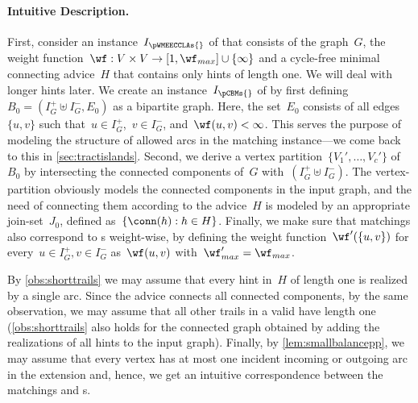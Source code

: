 \paragraph{Intuitive Description.}
First, consider an instance~$I_\pWMEECCLAs{}$ of \pWMEECCLAs{} that consists of the graph~$G$, the weight function~$\wf: V \times V \rightarrow [1, \wf_{max}]\cup \{\infty\}$ and a cycle-free minimal connecting advice~$H$ that contains only hints of length one. We will deal with longer hints later. We create an instance~$I_\pCBMs{}$ of \pCBMs{} by first defining~$B_0 = (I_G^+ \uplus I_G^-, E_0)$ as a bipartite graph. Here, the set~$E_0$ consists of all edges~$\{u, v\}$ such that~$u \in I_G^+$,~$v \in I_G^-$, and~$\wf(u, v) < \infty$. This serves the purpose of modeling the structure of allowed arcs in the matching instance---we come back to this in \autoref{sec:tractislands}. Second, we derive a vertex partition~$\{V_1', \ldots, V_c'\}$ of~$B_0$ by intersecting the connected components of~$G$ with~$(I_G^+ \uplus I_G^-)$. The vertex-partition obviously models the connected components in the input graph, and the need of connecting them according to the advice~$H$ is modeled by an appropriate join-set~$J_0$, defined as~$\{\conn(h): h \in H\}$. Finally, we make sure that matchings also correspond to \EE s weight-wise, by defining the weight function~$\wf'(\{u, v\})$ for every~$u \in I_G^+, v \in I_G^-$ as~$\wf(u, v)$ with~$\wf_{max}' = \wf_{max}$.

By \autoref{obs:shorttrails} we may assume that every hint in~$H$ of length one is realized by a single arc. Since the advice connects all connected components, by the same observation, we may assume that all other trails in a valid \EE{} have length one (\autoref{obs:shorttrails} also holds for the connected graph obtained by adding the realizations of all hints to the input graph). Finally, by \autoref{lem:smallbalancepp}, we may assume that every vertex has at most one incident incoming or outgoing arc in the extension and, hence, we get an intuitive correspondence between the matchings and \EE s. 

